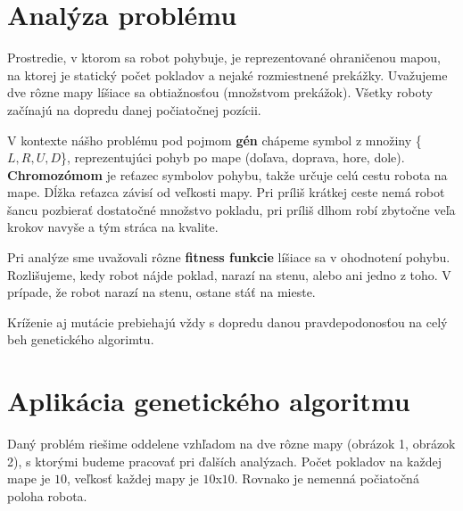 \documentclass[10pt]{paper}
\begin{document}
\newpage

\section{Analýza problému}

Prostredie, v ktorom sa robot pohybuje, je reprezentované ohraničenou mapou, na ktorej je statický počet pokladov a nejaké rozmiestnené prekážky. Uvažujeme dve rôzne mapy líšiace sa obtiažnosťou (množstvom prekážok). Všetky roboty začínajú na dopredu danej počiatočnej pozícii.

V kontexte nášho problému pod pojmom \textbf{gén} chápeme symbol z množiny \{$L, R, U, D$\}, reprezentujúci pohyb po mape (doľava, doprava, hore, dole). \textbf{Chromozómom} je reťazec symbolov pohybu, takže určuje celú cestu robota na mape. Dĺžka reťazca závisí od veľkosti mapy. Pri príliš krátkej ceste nemá robot šancu pozbierať dostatočné množstvo pokladu, pri príliš dlhom robí zbytočne veľa krokov navyše a tým stráca na kvalite. 

Pri analýze sme uvažovali rôzne \textbf{fitness funkcie} líšiace sa v ohodnotení pohybu. Rozlišujeme, kedy robot nájde poklad, narazí na stenu, alebo ani jedno z toho. V prípade, že robot narazí na stenu, ostane stáť na mieste.

Kríženie aj mutácie prebiehajú vždy s dopredu danou pravdepodonosťou na celý beh genetického algorimtu.

\section{Aplikácia genetického algoritmu}
Daný problém riešime oddelene vzhľadom na dve rôzne mapy (obrázok 1, obrázok 2), s ktorými budeme pracovať pri ďalších analýzach. Počet pokladov na každej mape je $10$, veľkosť každej mapy je $10$x$10$. Rovnako je nemenná počiatočná poloha robota.
\end{document}
